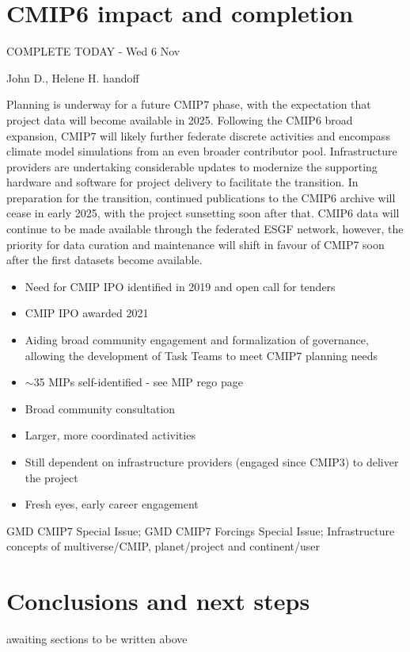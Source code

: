\documentclass[gmd, preprint]{copernicus}
\def\cred#1{{\color{red}#1}}
\def\cblue#1{{\color{blue}#1}}
\begin{document}
\section{CMIP6 impact and completion}
\label{sec:CMIP6Completion}
\cblue{COMPLETE TODAY - Wed 6 Nov}

\cred{John D., Helene H. handoff}

Planning is underway for a future CMIP7 phase, with the expectation that project data will become available in 2025. Following the CMIP6 broad expansion, CMIP7 will likely further federate discrete activities and encompass climate model simulations from an even broader contributor pool. Infrastructure providers are undertaking considerable updates to modernize the supporting hardware and software for project delivery to facilitate the transition. In preparation for the transition, continued publications to the CMIP6 archive will cease in early 2025, with the project sunsetting soon after that. CMIP6 data will continue to be made available through the federated ESGF network, however, the priority for data curation and maintenance will shift in favour of CMIP7 soon after the first datasets become available.

\cred{
\begin{itemize}
	\item Need for CMIP IPO identified in 2019 and open call for tenders
	\item CMIP IPO awarded 2021
	\item Aiding broad community engagement and formalization of governance, allowing the development of Task Teams to meet CMIP7 planning needs
	\item $\sim$35 MIPs self-identified - see MIP rego page
	\item Broad community consultation
	\item Larger, more coordinated activities
	\item Still dependent on infrastructure providers (engaged since CMIP3) to deliver the project
    \item Fresh eyes, early career engagement
\end{itemize}
}

\cred{GMD CMIP7 Special Issue; GMD CMIP7 Forcings Special Issue; Infrastructure concepts of multiverse/CMIP, planet/project and continent/user}



\section{Conclusions and next steps} %
\label{sec:Conclusions}
\cred{awaiting sections to be written above}
\end{document}
